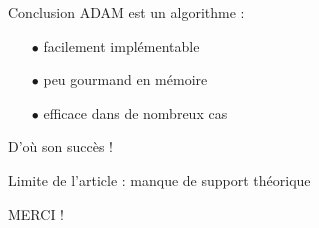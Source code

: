 \documentclass[11pt,aspectratio=169,xcolor=dvipsnames, french]{beamer}
\begin{document}
\begin{frame}{Conclusion}
ADAM est un algorithme :  

\begin{itemize}
\item[$\bullet$] facilement implémentable 
\item[$\bullet$] peu gourmand en mémoire
\item[$\bullet$] efficace dans de nombreux cas
\end{itemize}

D'où son succès !

Limite de l'article : manque de support théorique

\end{frame}

\begin{frame}{}
\begin{center}
 \huge MERCI !
 \end{center}
\end{frame}
\end{document}
